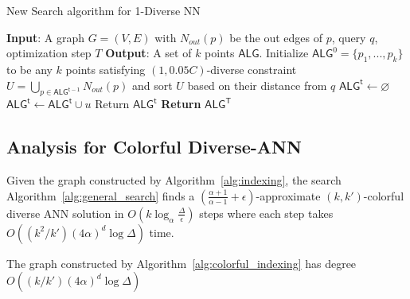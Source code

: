 \begin{algorithm}
\caption{New Search algorithm for 1-Diverse NN}
\label{alg:general_search}
\begin{algorithmic}[1]
\State \textbf{Input}: A graph $G=(V,E)$ with $N_{out}(p)$ be the out edges of $p$, query $q$, optimization step $T$
\State \textbf{Output}: A set of $k$ points $\mathsf{ALG}$.
\State Initialize $\mathsf{ALG}^0=\{p_1,...,p_k\}$ to be any $k$ points satisfying $(1,0.05C)$-diverse constraint
    \State $U=\bigcup\limits_{p\in \mathsf{ALG^{t-1}}}N_{out}(p)$ and sort $U$ based on their distance from $q$
    \State $\mathsf{ALG^t}\gets \varnothing$
            \State $\mathsf{ALG^t}\gets \mathsf{ALG^t}\cup u$
        \EndIf
    \EndFor
    \State Return $\mathsf{ALG^t}$
    \EndIf
\EndFor
\State \textbf{Return} $\mathsf{ALG^T}$
\end{algorithmic}
\end{algorithm}

\fi

\iffalse 

\subsection{Analysis for Colorful Diverse-ANN}

\begin{theorem}\label{thm:colorful_diverse_ann}
Given the graph constructed by Algorithm~\ref{alg:indexing}, the search Algorithm~\ref{alg:general_search} finds a $\left(\frac{\alpha+1}{\alpha-1}+\epsilon\right)$-approximate $(k,k')$-colorful diverse ANN solution in $O(k\log_{\alpha}\frac{\Delta}{\epsilon})$ steps where each step takes $O((k^2/k')(4\alpha)^d\log\Delta)$ time.
\end{theorem}


\begin{lemma}\label{lm:degree_colorful}
The graph constructed by Algorithm~\ref{alg:colorful_indexing} has degree $O((k/k')(4\alpha)^d\log\Delta)$
\end{lemma}

